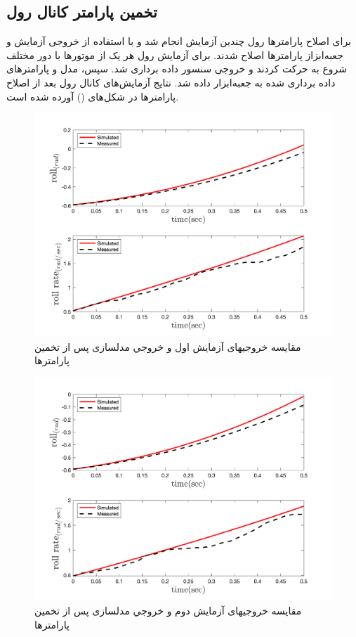 \subsection{تخمین پارامتر کانال رول}
برای اصلاح پارامترها رول چندین آزمایش انجام شد و با استفاده از خروجی آزمایش و جعبه‌ابزاز
پارامترها اصلاح شدند.
برای آزمایش رول هر یک از موتورها با دور مختلف شروع به حرکت کردند و خروجی سنسور داده برداری شد. سپس، مدل و پارامترهای داده برداری شده به جعبه‌ابزار
داده شد. نتایج آزمایش‌های کانال رول بعد از اصلاح پارامترها در شکل‌های
()
آورده شده است.

\begin{figure}[H]
	\includegraphics[width=12cm]{../../Figures/RCP/roll_parameter_estimation/RCP_roll_S1.png}
	\centering
	\caption{مقايسه خروجيهای آزمايش اول و خروجي مدلسازی پس از تخمین پارامترها}
	\label{roll_ps1}
\end{figure}
\begin{figure}[H]
	\includegraphics[width=12cm]{../../Figures/RCP/roll_parameter_estimation/RCP_roll_S2.png}
	\centering
	\caption{مقايسه خروجيهای آزمايش دوم و خروجي مدلسازی پس از تخمین پارامترها}
	\label{roll_ps2}
\end{figure}
